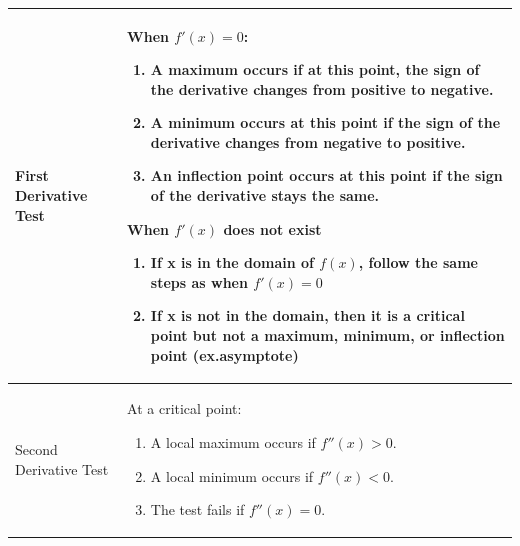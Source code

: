 \documentclass{ximera}
\begin{document}
\begin{center}
    \begin{tabular}{| l | p{7.5cm} |}
    \hline
    First Derivative Test & When $f'(x) = 0$: \begin{enumerate}
    \item{A maximum occurs if at this point, the sign of the derivative changes from positive to negative.}
    \item{A minimum occurs at this point if the sign of the derivative changes from negative to positive.}
    \item{An inflection point occurs at this point if the sign of the derivative stays the same.}
    \end{enumerate}
    \item{When $f'(x)$ does not exist\:}
    \begin{enumerate}
    \item{If x is in the domain of $f(x)$, follow the same steps as when $f'(x)=0$}
    \item{If x is not in the domain, then it is a critical point but not a maximum, minimum, or inflection point (ex.asymptote)}
    \end{enumerate}\\
    \hline
    Second Derivative Test &  At a critical point: \begin{enumerate}
    \item{A local maximum occurs if $f''(x)>0$.}
    \item{A local minimum occurs if $f''(x)<0$.}
    \item{The test fails if $f''(x)=0$.}
    \end{enumerate}\\ \hline
    \end{tabular}
\end{center}
\end{document}
